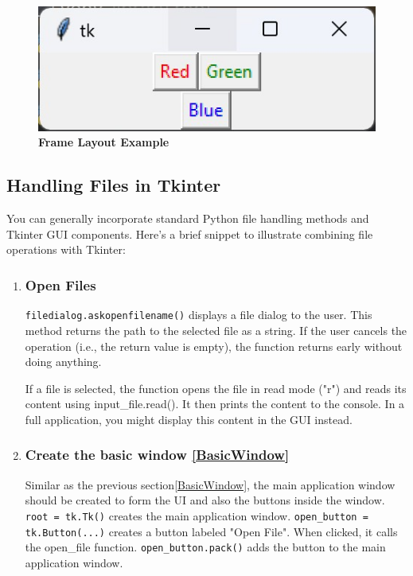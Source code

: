 \begin{figure}[h!]
    \centering
    \includegraphics[width=\textwidth]{Images/TKinter/FrameLayout}
    \caption{\textbf{Frame Layout Example}}
\end{figure}

\subsection{Handling Files in Tkinter}

You can generally incorporate standard Python file handling methods and Tkinter GUI components. Here's a brief snippet to illustrate combining file operations with Tkinter:

\begin{enumerate}
    
    \item \subsubsection{Open Files}
    \texttt{filedialog.askopenfilename()} displays a file dialog to the user. This method returns the path to the selected file as a string. If the user cancels the operation (i.e., the return value is empty), the function returns early without doing anything.
    
    If a file is selected, the function opens the file in read mode ("r") and reads its content using input\_file.read(). It then prints the content to the console. In a full application, you might display this content in the GUI instead.
    
    \item \subsubsection{Create the basic window \ref{BasicWindow}}
    
    Similar as the previous section\ref{BasicWindow}, the main application window should be created to form the UI and also the buttons inside the window. \texttt{root = tk.Tk()} creates the main application window. \texttt{open\_button = tk.Button(...)} creates a button labeled "Open File". When clicked, it calls the open\_file function. \texttt{open\_button.pack()} adds the button to the main application window.
    
\end{enumerate}

